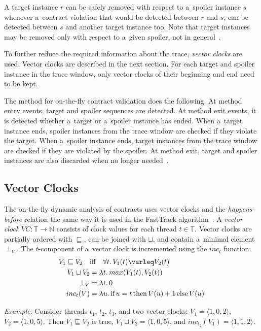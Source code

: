 A target instance $r$ can be safely removed with respect to a~spoiler instance
$s$ whenever a~contract violation that would be detected between $r$ and $s$,
can be detected between $s$ and another target instance too. Note that target
instances may be removed only with respect to a~given spoiler, not in
general~\cite{contracts}.

To further reduce the required information about the trace, \emph{vector clocks}
are used. Vector clocks are described in the next section. For each target and
spoiler instance in the trace window, only vector clocks of their beginning and
end need to be kept.

The method for on-the-fly contract validation does the following. At method
entry events, target and spoiler sequences are detected. At method exit events,
it is detected whether a~target or a~spoiler instance has ended. When a~target
instance ends, spoiler instances from the trace window are checked if they
violate the target. When a~spoiler instance ends, target instances from the
trace window are checked if they are violated by the spoiler. At method exit,
target and spoiler instances are also discarded when no longer
needed~\cite{contracts}.

\subsection{Vector Clocks}

The on-the-fly dynamic analysis of contracts uses vector clocks and the
\emph{happens-before} relation the same way it is used in the FastTrack
algorithm~\cite{fasttrack}. A \emph{vector clock} $VC: \mathbb{T} \rightarrow
\mathbb{N}$ consists of clock values for each thread $t \in \mathbb{T}$. Vector
clocks are partially ordered with $\sqsubseteq$, can be joined with $\sqcup$,
and contain a~minimal element $\perp_V$. The $t$-component of a~vector clock is
incremented using the $inc_t$ function.
\begin{align*}
    V_1 \sqsubseteq V_2 \quad &\text{iff} \quad \forall t. \, V_1(t) \varleq
    V_2(t) \\
    V_1 \sqcup V_2 &= \lambda t. \, max(V_1(t), V_2(t)) \\
    \perp_V &= \lambda t. \, 0 \\
    inc_t(V) &= \lambda u. \, \text{if} \, u=t \, \text{then} \, V(u)+1 \,
    \text{else} \, V(u)
\end{align*}

\medskip \noindent
\emph{Example}. Consider threads $t_1$, $t_2$, $t_3$, and two vector clocks:
$V_1 = \langle 1,0,2 \rangle$, $V_2 = \langle 1,0,5 \rangle$. Then $V_1
\sqsubseteq V_2$ is true, $V_1 \sqcup V_2 = \langle 1,0,5 \rangle$, and
$inc_{t_2}(V_1) = \langle 1,1,2 \rangle$.

